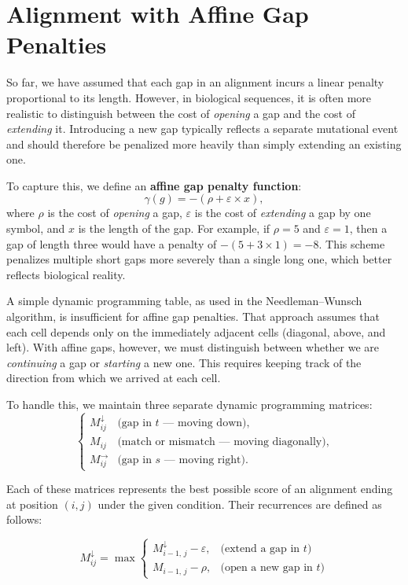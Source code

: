 \section{Alignment with Affine Gap Penalties}

So far, we have assumed that each gap in an alignment incurs a linear penalty proportional to its length. 
However, in biological sequences, it is often more realistic to distinguish between the cost of \emph{opening} a gap 
and the cost of \emph{extending} it. Introducing a new gap typically reflects a separate mutational event and 
should therefore be penalized more heavily than simply extending an existing one. 

To capture this, we define an \textbf{affine gap penalty function}:
\[
\gamma(g) = -(\rho + \varepsilon \times x),
\]
where $\rho$ is the cost of \emph{opening} a gap, $\varepsilon$ is the cost of \emph{extending} a gap by one symbol, 
and $x$ is the length of the gap. For example, if $\rho = 5$ and $\varepsilon = 1$, then a gap of length three 
would have a penalty of $-(5 + 3\times1) = -8$. This scheme penalizes multiple short gaps more severely than 
a single long one, which better reflects biological reality.

A simple dynamic programming table, as used in the Needleman–Wunsch algorithm, is insufficient for affine gap penalties. 
That approach assumes that each cell depends only on the immediately adjacent cells (diagonal, above, and left). 
With affine gaps, however, we must distinguish between whether we are \emph{continuing} a gap or 
\emph{starting} a new one. This requires keeping track of the direction from which we arrived at each cell.

To handle this, we maintain three separate dynamic programming matrices:
\[
\begin{cases}
M_{ij}^\downarrow & \text{(gap in $t$ — moving down)},\\[4pt]
M_{ij} & \text{(match or mismatch — moving diagonally)},\\[4pt]
M_{ij}^\rightarrow & \text{(gap in $s$ — moving right)}.
\end{cases}
\]

Each of these matrices represents the best possible score of an alignment ending at position $(i,j)$ 
under the given condition. Their recurrences are defined as follows:

\[
M_{ij}^\downarrow = \max
\begin{cases}
M_{i-1,\,j}^\downarrow - \varepsilon, & \text{(extend a gap in $t$)}\\[4pt]
M_{i-1,\,j} - \rho, & \text{(open a new gap in $t$)}
\end{cases}
\]

